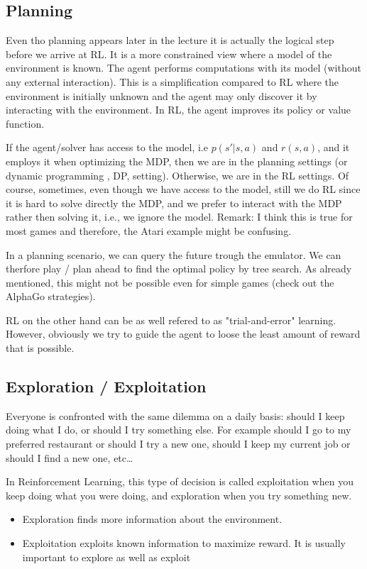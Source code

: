 \documentclass[main]{subfiles}
\begin{document}
\subsection{Planning}
Even tho planning appears later in the lecture it is actually the logical step before we arrive at RL. It is  a more constrained view where a model of the environment is known. 
The agent performs computations with its model (without any external interaction). 
This is a simplification compared to RL where the environment is initially unknown and the agent may only discover it by interacting with the environment. 
In RL, the agent improves its policy or value function.


If the agent/solver has access to the model, i.e $p(s'|s,a)$ and $r(s,a)$, and it employs it when optimizing the MDP, then we are in the planning settings (or dynamic programming , DP, setting). Otherwise, we are in the RL settings. Of course, sometimes, even though we have access to the model, still we do RL since it is hard to solve directly the MDP, and we prefer to interact with the MDP rather then solving it, i.e., we ignore the model. Remark: I think this is true for most games and therefore, the Atari example might be confusing.


In a planning scenario, we can query the future trough the emulator. We can therfore play / plan ahead to find the optimal policy by tree search. As already mentioned, this might not be possible even for simple games (check out the AlphaGo strategies).

RL on the other hand can be as well refered to as "trial-and-error" learning. However, obviously we try to guide the agent to loose the least amount of reward that is possible.

\subsection{Exploration / Exploitation}
Everyone is confronted with the same dilemma on a daily basis: should I keep doing what I do, or should I try something else.
For example should I go to my preferred restaurant or should I try a new one, should I keep my current job or should I find a new one, etc…

In Reinforcement Learning, this type of decision is called exploitation when you keep doing what you were doing, and exploration when you try something new.

\begin{itemize}
    \item Exploration finds more information about the environment. 
    \item Exploitation exploits known information to maximize reward. It is usually important to explore as well as exploit
\end{itemize}
\end{document}
